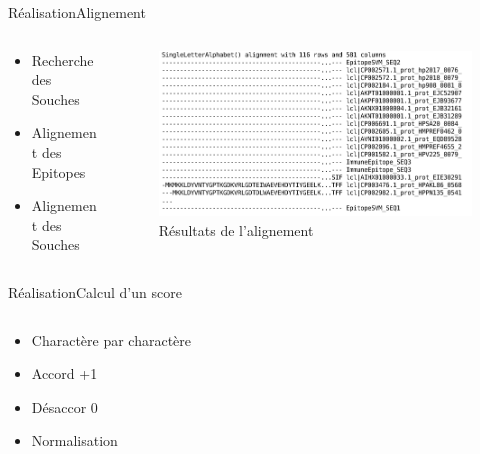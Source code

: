 \documentclass{PresentationHEIGVD}
\begin{document}
\begin{frame}{Réalisation}{Alignement}
\begin{columns}[c]
	\begin{column}[c]{5cm}
		\begin{itemize}[<+->]
			\item Recherche des Souches
			\item Alignement des Epitopes
			\item Alignement des Souches
		\end{itemize}
	\end{column}
	\begin{column}[c]{5cm}
		\begin{figure}
		\includegraphics[width=\textwidth]{img/align.png}
		\caption{Résultats de l'alignement}
		\end{figure}
	\end{column}
\end{columns}

\end{frame}


\begin{frame}{Réalisation}{Calcul d'un score}
\begin{columns}[c]
	\begin{column}[c]{5cm}
		\begin{itemize}[<+->]
			\item Charactère par charactère
			\item Accord +1
			\item Désaccor 0
			\item Normalisation
		\end{itemize}
	\end{column}
	\begin{column}[c]{5cm}
		
	\end{column}
\end{columns}

\end{frame}
\end{document}
